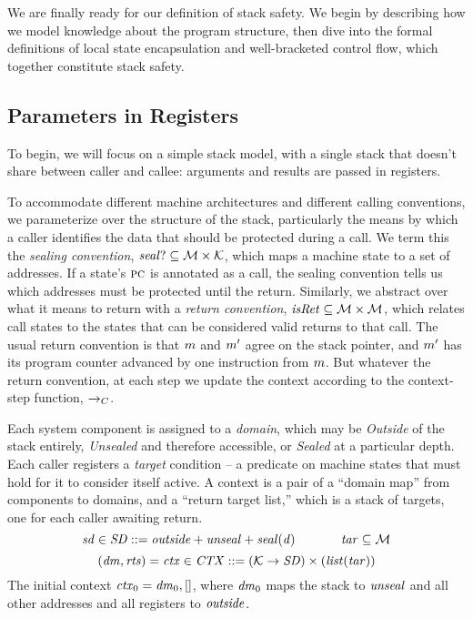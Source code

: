 \documentclass[acmsmall,review,anonymous]{acmart}\settopmatter{printfolios=true,printccs=false,printacmref=false}
\begin{document}
We are finally ready for our definition of stack safety. We begin
by describing how we model knowledge about the program structure,
then dive into the formal definitions of local state encapsulation and
well-bracketed control flow, which together constitute stack safety.

\subsection{Parameters in Registers}

To begin, we will focus on a simple stack model, with a single stack
that doesn't share between caller and callee: arguments and results are passed
in registers.

To accommodate different machine architectures and different calling
conventions, we parameterize over the structure of the stack, particularly
the means by
which a caller identifies the data that should be protected during a call. We term
this the {\em sealing convention}, \(\mathit{seal?} \subseteq {\mathcal M} \times {\mathcal K}\), which
maps a machine state to a set of addresses. 
If a state's \(\textsc{pc}\) is annotated as a call, the sealing convention tells us
which addresses must be protected until the return. Similarly, we abstract over what
it means to return with a {\em return convention}, \(\mathit{isRet} \subseteq {\mathcal M} \times {\mathcal M}\),
which relates call states to the states that can be considered valid returns to that call.
The usual return convention is that \(m\) and \(m'\) agree on the stack pointer,
and \(m'\) has its program counter advanced by one instruction from \(m\).
But whatever the return convention, at each step we update the context according
to the context-step function, \(\xrightarrow{}_C\).

Each system component is assigned to a {\em domain}, which may be {\em Outside}
of the stack entirely, {\em Unsealed} and therefore accessible, or {\em Sealed}
at a particular depth. Each caller registers a {\em target}
condition -- a predicate on machine states that must hold for it to consider itself active.
A context is a pair of a ``domain map'' from components to domains, and a
``return target list,'' which is a stack of targets, one for each caller awaiting
return.  \ifaftersubmission{}\fi
%
\[\mathit{sd} \in \mathit{SD} ::= \mathit{outside} + \mathit{unseal} + \mathit{seal(d)} \hspace*{0.5in} \mathit{tar} \subseteq {\mathcal M}\]
\[(\mathit{dm},\mathit{rts}) = \mathit{ctx} \in \mathit{CTX} ::= ({\mathcal K} \rightarrow \mathit{SD})
  \times (\mathit{list} (\mathit{tar})) \]
%
The initial context \(\mathit{ctx}_0 = \mathit{dm}_0, []\), where \(\mathit{dm}_0\) maps
the stack to \(\mathit{unseal}\) and all other addresses and all registers to \(\mathit{outside}\).
\end{document}
